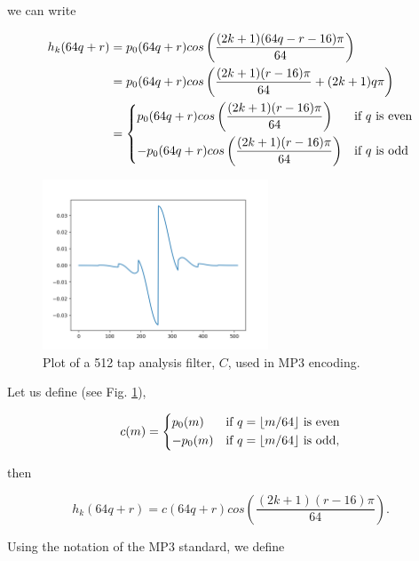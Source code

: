 \documentclass[11pt,a4paper]{article}
\begin{document}
we can write

\begin{align}
h_k(64q + r) &= p_0(64q + r)cos\left(\frac{(2k + 1) (64q - r - 16)\pi}{64} \right) \\
			&= p_0(64q + r)cos\left(\frac{(2k + 1) (r - 16)\pi}{64} + (2k + 1)q\pi \right) \\
			&= 
			\begin{dcases}
				p_0(64q+r)cos\left(\frac{(2k + 1) (r - 16)\pi}{64} \right) &\text{if $q$ is even} \\
				-p_0(64q+r)cos\left(\frac{(2k + 1) (r - 16)\pi}{64} \right) &\text{if $q$ is odd}
			\end{dcases}
\end{align}

\begin{figure}[ht]
	\centering
	\includegraphics[width=0.6\textwidth]{analysis/c_taps}
	\caption{Plot of a 512 tap analysis filter, $C$, used in MP3 encoding.}
	\label{fig:c_taps}
\end{figure}

Let us define (see Fig. \ref{fig:c_taps}),

\begin{equation}
c(m) = 
	\begin{dcases}
		p_0(m) &\text{if $q=\lfloor m/64 \rfloor$ is even} \\
		-p_0(m) &\text{if $q=\lfloor m/64 \rfloor$ is odd},
	\end{dcases}
\end{equation}

then

\begin{equation}
h_k(64q+r) = c(64q+r)cos\left(\frac{(2k + 1) (r - 16)\pi}{64} \right).
\end{equation}

\pagebreak

Using the notation of the MP3 standard, we define
\end{document}
